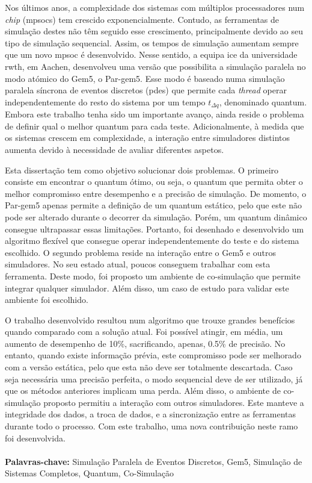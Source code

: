 
\vspace*{-0.5cm}

Nos últimos anos, a complexidade dos sistemas com múltiplos processadores num \textit{chip} (\glspl{mpsoc}) tem crescido exponencialmente. 
Contudo, as ferramentas de simulação destes não têm seguido esse crescimento, principalmente devido ao seu tipo de simulação sequencial. 
Assim, os tempos de simulação aumentam sempre que um novo \gls{mpsoc} é desenvolvido. Nesse sentido, a equipa \gls{ice} da universidade 
\gls{rwth}, em Aachen, desenvolveu uma versão que possibilita a simulação paralela no modo atómico do Gem5, o Par-gem5. Esse modo é baseado 
numa simulação paralela síncrona de eventos discretos (\gls{pdes}) que permite cada \textit{thread} operar independentemente do 
resto do sistema por um tempo $t_{\Delta q}$, denominado quantum. Embora este trabalho tenha sido um importante avanço, ainda reside o problema 
de definir qual o melhor quantum para cada teste. Adicionalmente, à medida que os sistemas crescem em complexidade, a interação entre 
simuladores distintos aumenta devido à necessidade de avaliar diferentes aspetos. 

Esta dissertação tem como objetivo solucionar dois problemas. O primeiro consiste em encontrar o quantum ótimo, ou seja, o quantum que permita obter o 
melhor compromisso entre desempenho e a precisão de simulação. De momento, o Par-gem5 apenas permite a definição de um quantum 
estático, pelo que este não pode ser alterado durante o decorrer da simulação. Porém, um quantum dinâmico consegue ultrapassar essas limitações. 
Portanto, foi desenhado e desenvolvido um algoritmo flexível que consegue operar independentemente do teste e do sistema escolhido. O segundo 
problema reside na interação entre o Gem5 e outros simuladores. No seu estado atual, poucos conseguem trabalhar com esta ferramenta. Deste modo, foi 
proposto um ambiente de co-simulação que permite integrar qualquer simulador. Além disso, um caso de estudo para validar este ambiente foi escolhido. 

O trabalho desenvolvido resultou num algoritmo que trouxe grandes benefícios quando comparado com a solução atual. Foi possível atingir, 
em média, um aumento de desempenho de 10\%, sacrificando, apenas, 0.5\% de precisão. No entanto, quando existe informação prévia, 
este compromisso pode ser melhorado com a versão estática, pelo que esta não deve ser totalmente descartada. Caso seja necessária uma 
precisão perfeita, o modo sequencial deve de ser utilizado, já que os métodos anteriores implicam uma perda. Além disso, o ambiente 
de co-simulação proposto permitiu a interação com outros simuladores. Este manteve a integridade dos dados, a troca de dados, e a sincronização 
entre as ferramentas durante todo o processo. Com este trabalho, uma nova contribuição neste ramo foi desenvolvida.

\paragraph{}\textbf{Palavras-chave:} Simulação Paralela de Eventos Discretos, Gem5, Simulação de Sistemas Completos, Quantum, Co-Simulação
